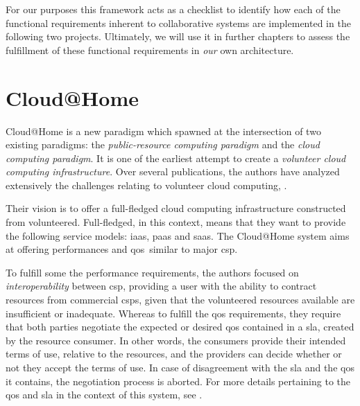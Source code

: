 \documentclass[12pt, titlepage]{uo_temp}
\begin{document}
     For our purposes this framework acts as a checklist to identify how each of the
     functional requirements inherent to collaborative systems are implemented in the
     following two projects. Ultimately, we will use it in further chapters to assess the
     fulfillment of these functional requirements in \emph{our} own architecture.
     
     \section{Cloud@Home}
     Cloud@Home is a new paradigm which spawned at the intersection of two existing
     paradigms: the \emph{public-resource computing paradigm} and the \emph{cloud
       computing paradigm}. It is one of the earliest attempt to create a \emph{volunteer
       cloud computing infrastructure}. Over several publications, the authors have
     analyzed extensively the challenges relating to volunteer cloud computing,
     \cite{cunsolo2009volunteer} \cite{aversa2011cloudperf} \cite{aversa2011cloud}
     \cite{cunsolo2010applying} \cite{cunsolo2010volunteer} \cite{distefano2010taxonomic}
     \cite{cathome6} \cite{cunsolo2010cloud} \cite{cathome9} \cite{cathome11}
     \cite{distefano2011qos}.
     
     Their vision is to offer a full-fledged cloud computing infrastructure constructed
     from volunteered. Full-fledged, in this context, means that they want to provide the
     following service models: \gls{iaas}, \gls{paas} and \gls{saas}. The Cloud@Home
     system aims at offering performances and \gls{qos}\ similar to major \gls{csp}.
     
     To fulfill some the performance requirements, the authors focused on
     \emph{interoperability} between \gls{csp}, providing a user with the ability to
     contract resources from commercial \gls{csp}s, given that the volunteered resources
     available are insufficient or inadequate. Whereas to fulfill the \gls{qos}
     requirements, they require that both parties negotiate the expected or desired
     \gls{qos} contained in a \gls{sla}, created by the resource consumer. In other words,
     the consumers provide their intended terms of use, relative to the resources, and the
     providers can decide whether or not they accept the terms of use. In case of
     disagreement with the \gls{sla} and the \gls{qos} it contains, the negotiation
     process is aborted. For more details pertaining to the \gls{qos} and \gls{sla} in the
     context of this system, see \cite{distefano2011qos}.
\end{document}
